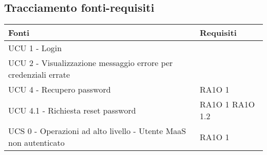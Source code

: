 \subsection{Tracciamento fonti-requisiti}
      \begin{center}
      \bgroup
      \def\arraystretch{1.8}
      \begin{longtable}{ | p{5cm} | p{5cm} |}
    
      \cellcolor[gray]{0.9} \textbf{Fonti} & \cellcolor[gray]{0.9} \textbf{Requisiti} \\ \hline       
            UCU 1 - Login &  \\ \hline      
            UCU 2 - Visualizzazione messaggio errore per credenziali errate &  \\ \hline      
            UCU 4 - Recupero password &  RA1O 1 \newline  \\ \hline      
            UCU 4.1 - Richiesta reset password &  RA1O 1 \newline  RA1O 1.2 \newline  \\ \hline      
            UCS 0 - Operazioni ad alto livello - Utente MaaS non autenticato &  RA1O 1 \newline  \\ \hline     
      \end{longtable}
      \egroup
      \end{center}  
\clearpage

